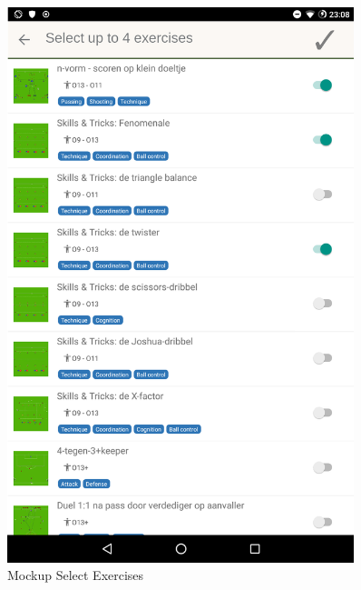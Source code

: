 \begin{appendices}
\begin{figure}[H]
    \centering
    \includegraphics[width=0.9\textwidth,keepaspectratio]{content/pictures/mockups/select-exercises.png}
    \caption{Mockup Select Exercises}
	\label{fig:mockup_select_exercises}
\end{figure}

\end{appendices}
